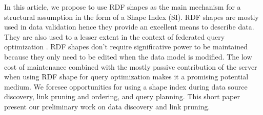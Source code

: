 In this article, we propose to use RDF shapes as the main mechanism for a structural assumption in the form of a Shape Index (SI). 
RDF shapes are mostly used in data validation \cite{Gayo2018a} hence they provide an excellent means to describe data.
They are also used to a lesser extent in the context of federated query optimization \cite{kashif2021}.
RDF shapes don't require significative power to be maintained because they only need to be edited 
when the data model is modified.
The low cost of maintenance combined with the mostly passive contribution of 
the server when using RDF shape for query optimization makes it a promising potential medium. 
We foresee opportunities for using a shape index during data source discovery, link pruning and ordering, and query planning.
This short paper present our preliminary work on data discovery and link pruning.

